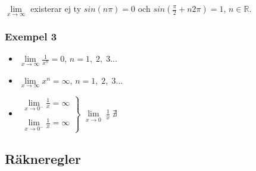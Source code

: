 \documentclass[swedish]{article}
\begin{document}
$\lim\limits_{x\to \infty}$ existerar ej ty $sin(n\pi) = 0$ och $sin\left(\frac{\pi}{2} + n2\pi \right) = 1$, $n\in \mathbb{R}$.

\subsubsection{Exempel 3}

\begin{itemize}
    \item{\; $\lim\limits_{x\to \infty} \frac{1}{x^n} = 0$,\; $n = 1,\; 2,\; 3...$}
    \item{\; $\lim\limits_{x\to \infty} x^n = \infty$,\; $n = 1,\; 2,\; 3...$}
    \item{$\left. \begin{array}{l}
    \lim\limits_{x\to 0^-} \frac{1}{x} = \infty\\
    \\
    \lim\limits_{x\to 0^-} \frac{1}{x} = \infty
    \end{array} \right\}$} $\lim\limits_{x\to 0} \; \frac{1}{x} \; \nexists$
\end{itemize}


\subsection{Räkneregler}
\end{document}
